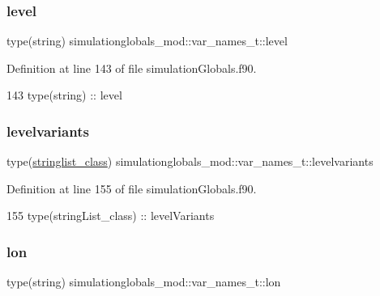 \subsubsection{\texorpdfstring{level}{level}}
{\footnotesize\ttfamily type(string) simulationglobals\+\_\+mod\+::var\+\_\+names\+\_\+t\+::level\hspace{0.3cm}{\ttfamily [private]}}



Definition at line 143 of file simulation\+Globals.\+f90.


\begin{DoxyCode}
143         \textcolor{keywordtype}{type}(string) :: level
\end{DoxyCode}
\mbox{\label{structsimulationglobals__mod_1_1var__names__t_a1995369a3480af51e624771301419238}} 
\subsubsection{\texorpdfstring{levelvariants}{levelvariants}}
{\footnotesize\ttfamily type(\mbox{\hyperlink{structsimulationglobals__mod_1_1stringlist__class}{stringlist\+\_\+class}}) simulationglobals\+\_\+mod\+::var\+\_\+names\+\_\+t\+::levelvariants\hspace{0.3cm}{\ttfamily [private]}}



Definition at line 155 of file simulation\+Globals.\+f90.


\begin{DoxyCode}
155         \textcolor{keywordtype}{type}(stringList\_class) :: levelVariants
\end{DoxyCode}
\mbox{\label{structsimulationglobals__mod_1_1var__names__t_ae81e1287e36878fcfed6360b14b05219}} 
\subsubsection{\texorpdfstring{lon}{lon}}
{\footnotesize\ttfamily type(string) simulationglobals\+\_\+mod\+::var\+\_\+names\+\_\+t\+::lon\hspace{0.3cm}{\ttfamily [private]}}



